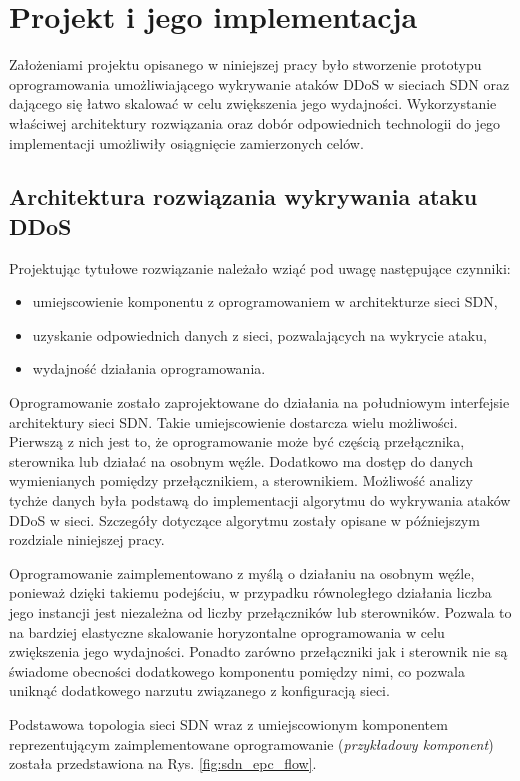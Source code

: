 \chapter{Projekt i jego implementacja}

Założeniami projektu opisanego w niniejszej pracy było stworzenie prototypu
oprogramowania umożliwiającego wykrywanie ataków DDoS w sieciach SDN oraz
dającego się łatwo skalować w celu zwiększenia jego wydajności. Wykorzystanie
właściwej architektury rozwiązania oraz dobór odpowiednich technologii do jego
implementacji umożliwiły osiągnięcie zamierzonych celów.

\section{Architektura rozwiązania wykrywania ataku DDoS}

Projektując tytułowe rozwiązanie należało wziąć pod uwagę następujące czynniki:
\begin{itemize}
  \item umiejscowienie komponentu z oprogramowaniem w architekturze sieci SDN,
  \item uzyskanie odpowiednich danych z sieci, pozwalających na wykrycie ataku,
  \item wydajność działania oprogramowania.
\end{itemize}

Oprogramowanie zostało zaprojektowane do działania na południowym interfejsie
architektury sieci SDN. Takie umiejscowienie dostarcza wielu możliwości.
Pierwszą z nich jest to, że oprogramowanie może być częścią przełącznika,
sterownika lub działać na osobnym węźle. Dodatkowo ma dostęp do danych
wymienianych pomiędzy przełącznikiem, a sterownikiem. Możliwość analizy tychże
danych była podstawą do implementacji algorytmu do wykrywania ataków DDoS w
sieci. Szczegóły dotyczące algorytmu zostały opisane w późniejszym rozdziale
niniejszej pracy.

Oprogramowanie zaimplementowano z myślą o działaniu na osobnym węźle,
ponieważ dzięki takiemu podejściu, w przypadku równoległego działania liczba
jego instancji jest niezależna od liczby przełączników lub sterowników. Pozwala
to na bardziej elastyczne skalowanie horyzontalne oprogramowania w celu
zwiększenia jego wydajności. Ponadto zarówno przełączniki jak i sterownik nie są
świadome obecności dodatkowego komponentu pomiędzy nimi, co pozwala uniknąć
dodatkowego narzutu związanego z konfiguracją sieci.

Podstawowa topologia sieci SDN wraz z umiejscowionym komponentem reprezentującym
zaimplementowane oprogramowanie (\textit{przykładowy komponent}) została
przedstawiona na Rys. \ref{fig:sdn_epc_flow}. 

